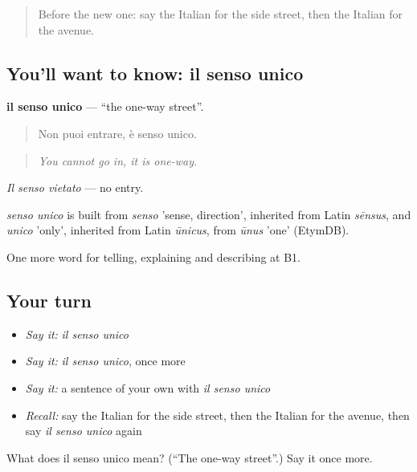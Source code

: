\label{lesson:IT-C441-senso-unico}



\begin{quote}
Before the new one: say the Italian for the side street, then the Italian for the avenue.
\end{quote}

\subsection*{You'll want to know: il senso unico}
\textbf{il senso unico} — \textquotedblleft{}the one-way street\textquotedblright{}.

\begin{quote}
Non puoi entrare, è senso unico.
\end{quote}

\begin{quote}
\emph{You cannot go in, it is one-way.}
\end{quote}

\emph{Il senso vietato} — no entry.

\begin{cousinweb}
\emph{senso unico} is built from \emph{senso} 'sense, direction', inherited from Latin \emph{sēnsus}, and \emph{unico} 'only', inherited from Latin \emph{ūnicus}, from \emph{ūnus} 'one' (EtymDB).
\end{cousinweb}

\begin{grammarlens}[title={What you've built}]
One more word for telling, explaining and describing at B1.
\end{grammarlens}

\subsection*{Your turn}
\begin{itemize}
\raggedright
  \item \emph{Say it:} \emph{il senso unico}
  \item \emph{Say it:} \emph{il senso unico}, once more
  \item \emph{Say it:} a sentence of your own with \emph{il senso unico}
  \item \emph{Recall:} say the Italian for the side street, then the Italian for the avenue, then say \emph{il senso unico} again
\end{itemize}

\begin{tcolorbox}[breakable,colback=teal!4,colframe=teal!35!black,title={Before you move on}]
What does il senso unico mean? (\textquotedblleft{}The one-way street\textquotedblright{}.) Say it once more.
\end{tcolorbox}
